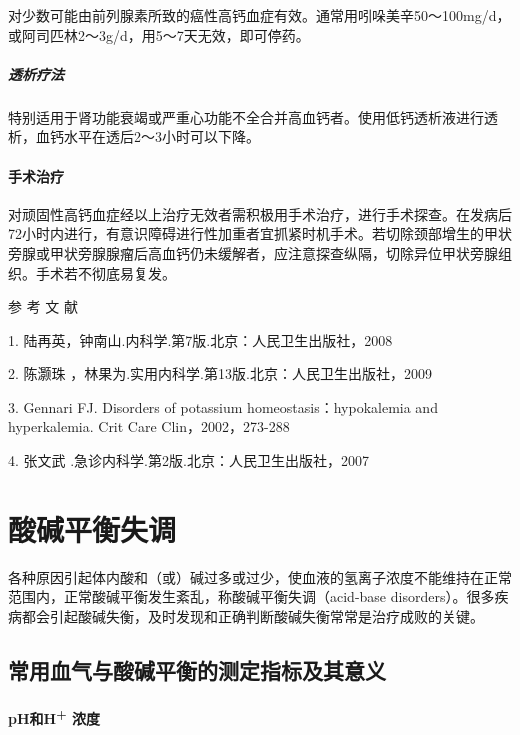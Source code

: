 对少数可能由前列腺素所致的癌性高钙血症有效。通常用吲哚美辛50～100mg/d，或阿司匹林2～3g/d，用5～7天无效，即可停药。

\paragraph{透析疗法}

特别适用于肾功能衰竭或严重心功能不全合并高血钙者。使用低钙透析液进行透析，血钙水平在透后2～3小时可以下降。

\subsubsection{手术治疗}

对顽固性高钙血症经以上治疗无效者需积极用手术治疗，进行手术探查。在发病后72小时内进行，有意识障碍进行性加重者宜抓紧时机手术。若切除颈部增生的甲状旁腺或甲状旁腺腺瘤后高血钙仍未缓解者，应注意探查纵隔，切除异位甲状旁腺组织。手术若不彻底易复发。

\protect\hypertarget{text00201.html}{}{}

\hypertarget{text00201.htmlux5cux23CHP6-4-3}{}
参 考 文 献

1. 陆再英，钟南山.内科学.第7版.北京：人民卫生出版社，2008

2. 陈灏珠 ，林果为.实用内科学.第13版.北京：人民卫生出版社，2009

3. Gennari FJ. Disorders of potassium homeostasis：hypokalemia and
hyperkalemia. Crit Care Clin，2002，273-288

4. 张文武 .急诊内科学.第2版.北京：人民卫生出版社，2007

\protect\hypertarget{text00202.html}{}{}

\chapter{酸碱平衡失调}

各种原因引起体内酸和（或）碱过多或过少，使血液的氢离子浓度不能维持在正常范围内，正常酸碱平衡发生紊乱，称酸碱平衡失调（acid-base
disorders）。很多疾病都会引起酸碱失衡，及时发现和正确判断酸碱失衡常常是治疗成败的关键。

\section{常用血气与酸碱平衡的测定指标及其意义}

\subsubsection{pH和H\textsuperscript{+} 浓度}

